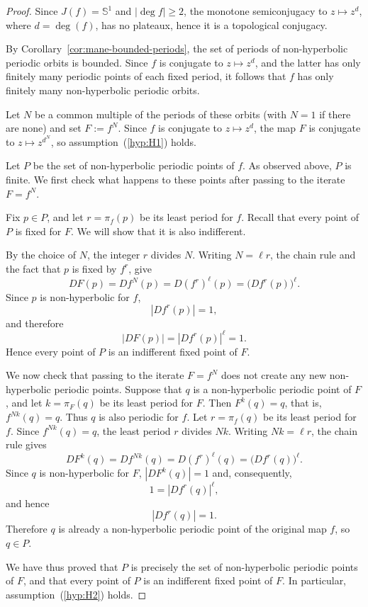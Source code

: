 \documentclass[12pt,a4paper,twoside]{article}
\theoremstyle{plain}
\theoremstyle{definition}
\newcommand{\Sone}{\mathbb{S}^1}
\begin{document}
\begin{proof}
	Since $J(f)=\Sone$ and $|\deg f|\ge2$, the monotone semiconjugacy to $z\mapsto z^d$, where $d=\deg(f)$, has no plateaux, hence it is a topological conjugacy.

	By Corollary~\ref{cor:mane-bounded-periods}, the set of periods of non-hyperbolic periodic orbits is bounded. Since $f$ is conjugate to $z\mapsto z^d$, and the latter has only finitely many periodic points of each fixed period, it follows that $f$ has only finitely many non-hyperbolic periodic orbits.

	Let $N$ be a common multiple of the periods of these orbits (with $N=1$ if there are none) and set $F:=f^N$. Since $f$ is conjugate to $z\mapsto z^d$, the map $F$ is conjugate to $z\mapsto z^{d^N}$, so assumption~(\ref{hyp:H1}) holds.

	Let \(P\) be the set of non-hyperbolic periodic points of \(f\). As observed above, \(P\) is finite. We first check what happens to these points after passing to the iterate \(F=f^N\).

Fix \(p\in P\), and let \(r=\pi_f(p)\) be its least period for \(f\). Recall that every point of $P$ is fixed for $F$. We will show that it is also indifferent.

By the choice of \(N\), the integer \(r\) divides \(N\). Writing $N=\ell r$, the chain rule and the fact that \(p\) is fixed by \(f^r\), give
\[
DF(p)
=
Df^N(p)
=
D(f^r)^\ell(p)
=
\bigl(Df^r(p)\bigr)^\ell.
\]
Since \(p\) is non-hyperbolic for \(f\),
\[
|Df^r(p)|=1,
\]
and therefore
\[
|DF(p)|
=
|Df^r(p)|^\ell
=
1.
\]
Hence every point of \(P\) is an indifferent fixed point of \(F\).

We now check that passing to the iterate \(F=f^N\) does not create any
new non-hyperbolic periodic points. Suppose that \(q\) is a non-hyperbolic periodic point of \(F\), and let \(k=\pi_F(q)\) be its least period for \(F\). Then $F^k(q)=q$, that is, $f^{Nk}(q)=q$. Thus \(q\) is also periodic for \(f\). Let \(r=\pi_f(q)\) be its least
period for \(f\). Since \(f^{Nk}(q)=q\), the least period \(r\) divides
\(Nk\). Writing $Nk=\ell r$, the chain rule gives
\[
DF^k(q)
=
Df^{Nk}(q)
=
D(f^r)^\ell(q)
=
\bigl(Df^r(q)\bigr)^\ell.
\]
Since \(q\) is non-hyperbolic for \(F\), $|DF^k(q)|=1$ and, consequently,
\[
1
=
|Df^r(q)|^\ell,
\]
and hence
\[
|Df^r(q)|=1.
\]
Therefore \(q\) is already a non-hyperbolic periodic point of the original
map \(f\), so \(q\in P\).

We have thus proved that \(P\) is precisely the set of non-hyperbolic
periodic points of \(F\), and that every point of \(P\) is an indifferent
fixed point of \(F\). In particular, assumption~(\ref{hyp:H2}) holds.


\end{proof}
\end{document}
